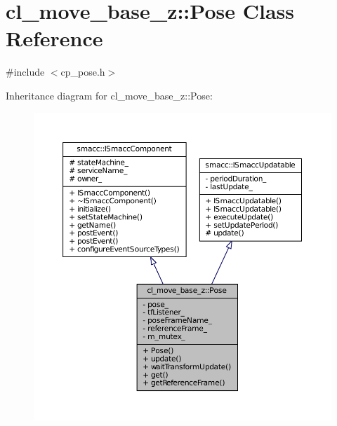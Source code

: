 \hypertarget{classcl__move__base__z_1_1Pose}{}\section{cl\+\_\+move\+\_\+base\+\_\+z\+:\+:Pose Class Reference}
\label{classcl__move__base__z_1_1Pose}


{\ttfamily \#include $<$cp\+\_\+pose.\+h$>$}



Inheritance diagram for cl\+\_\+move\+\_\+base\+\_\+z\+:\+:Pose\+:
\nopagebreak
\begin{figure}[H]
\begin{center}
\leavevmode
\includegraphics[width=350pt]{classcl__move__base__z_1_1Pose__inherit__graph}
\end{center}
\end{figure}


